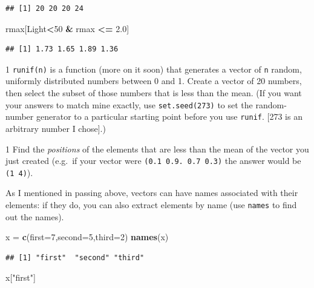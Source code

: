 \documentclass[11pt,]{article}
\newenvironment{Shaded}{\begin{snugshade}}{\end{snugshade}}
\newcommand{\DataTypeTok}[1]{\textcolor[rgb]{0.13,0.29,0.53}{#1}}
\newcommand{\DecValTok}[1]{\textcolor[rgb]{0.00,0.00,0.81}{#1}}
\newcommand{\FloatTok}[1]{\textcolor[rgb]{0.00,0.00,0.81}{#1}}
\newcommand{\KeywordTok}[1]{\textcolor[rgb]{0.13,0.29,0.53}{\textbf{#1}}}
\newcommand{\NormalTok}[1]{#1}
\newcommand{\OperatorTok}[1]{\textcolor[rgb]{0.81,0.36,0.00}{\textbf{#1}}}
\newcommand{\StringTok}[1]{\textcolor[rgb]{0.31,0.60,0.02}{#1}}
\let\BeginKnitrBlock\begin \let\EndKnitrBlock\end
\begin{document}
\begin{verbatim}
## [1] 20 20 20 24
\end{verbatim}

\begin{Shaded}
\begin{Highlighting}[]
\NormalTok{rmax[Light}\OperatorTok{<}\DecValTok{50} \OperatorTok{&}\StringTok{ }\NormalTok{rmax }\OperatorTok{<=}\StringTok{ }\FloatTok{2.0}\NormalTok{]}
\end{Highlighting}
\end{Shaded}

\begin{verbatim}
## [1] 1.73 1.65 1.89 1.36
\end{verbatim}

\BeginKnitrBlock{exercisebox}{1}
\texttt{runif(n)} is a function (more on it soon) that generates a vector of \texttt{n} random, uniformly distributed
numbers between 0 and 1. Create a vector of 20 numbers, then select the subset of those numbers that
is less than the mean. (If you want your answers to match mine exactly, use \texttt{set.seed(273)} to set the random-number generator to a particular starting point before you use \texttt{runif}. {[}273 is an arbitrary number I chose{]}.)
\EndKnitrBlock{exercisebox}

\BeginKnitrBlock{exercisebox}{1}
Find the \emph{positions} of the elements that are less than the mean of the vector you just created (e.g.~if your vector were \texttt{(0.1\ 0.9.\ 0.7\ 0.3)} the answer would be \texttt{(1\ 4)}).
\EndKnitrBlock{exercisebox}

As I mentioned in passing above, vectors can have names associated with their elements: if they do, you can also extract elements by name (use \texttt{names} to find out the names).

\begin{Shaded}
\begin{Highlighting}[]
\NormalTok{x =}\StringTok{ }\KeywordTok{c}\NormalTok{(}\DataTypeTok{first=}\DecValTok{7}\NormalTok{,}\DataTypeTok{second=}\DecValTok{5}\NormalTok{,}\DataTypeTok{third=}\DecValTok{2}\NormalTok{)}
\KeywordTok{names}\NormalTok{(x)}
\end{Highlighting}
\end{Shaded}

\begin{verbatim}
## [1] "first"  "second" "third"
\end{verbatim}

\begin{Shaded}
\begin{Highlighting}[]
\NormalTok{x[}\StringTok{"first"}\NormalTok{]}
\end{Highlighting}
\end{Shaded}
\end{document}
